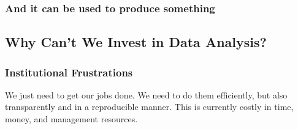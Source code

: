 \documentclass[12pt,handout]{beamer}
\begin{document}
{
\begin{frame}[plain]
\frametitle{And it can be used to produce something}
\end{frame}
}



\subsection{Why Can't We Invest in Data Analysis?}

\begin{frame}
\frametitle{Institutional Frustrations}
We just need to get our jobs done. We need to do them efficiently, but also transparently and in a reproducible manner. This is currently costly in time, money, and management resources.
\end{frame}

{
\begin{frame}[plain]
\end{frame}
}
\end{document}
